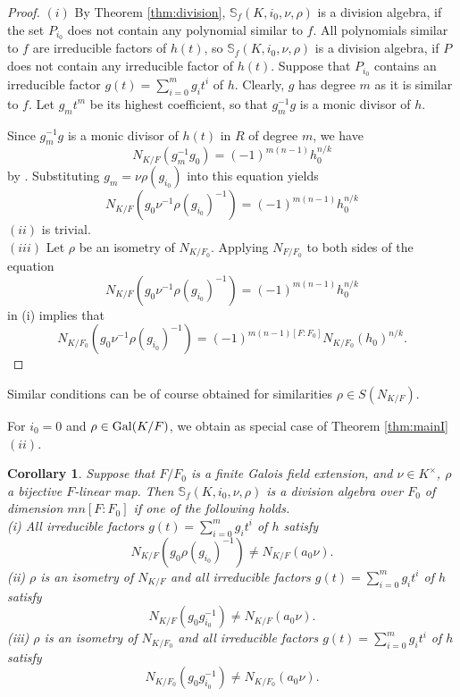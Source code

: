 \documentclass[12pt]{amsart}
\theoremstyle{plain}
\newtheorem{corollary}[theorem]{Corollary}
\theoremstyle{definition}
\numberwithin{equation}{section}
\numberwithin{figure}{section}
\begin{document}
\begin{proof}
$(i) $ By Theorem \ref{thm:division}, $\mathbb{S}_f(K,i_0,\nu,\rho)$
 is a division algebra, if the set $ P_{i_0} $  does not contain any polynomial similar to $f$. All polynomials similar to $f$ are
irreducible factors of $h(t)$, so $\mathbb{S}_f(K,i_0,\nu,\rho)$ is a division algebra, if $ P $ does not contain any irreducible factor of $h(t)$.
Suppose that $P_{i_0} $ contains an irreducible factor $g(t)=\sum_{i=0}^{m} g_it^i$ of $h$. Clearly,
 $g$ has degree $m$ as it is similar to $f$. Let  $g_{m} t^{m}$ be its highest coefficient, so that $g_{m}^{-1}g$ is a monic divisor of $h$.


Since  $g_{m}^{-1}g$ is a monic divisor of $h(t)$ in $R$ of degree $m$, we have
$$N_{K/F}(g_m^{-1}g_0 )=(-1)^{m(n-1)}h_0^{n/k}$$
 by \cite[Theorem 3.15]{NewS}.
Substituting $g_{m}=\nu\rho(g_{i_0})$
into this equation yields
$$N_{K/F}(g_0 \nu^{-1}\rho(g_{i_0})^{-1} )=(-1)^{m(n-1)}h_0^{n/k}$$
 $(ii)$ is trivial.
 \\ $(iii)$ Let $\rho $ be an isometry of $N_{K/F_0}$. Applying $N_{F/F_0}$ to both sides of the equation
 $$N_{K/F}(g_0 \nu^{-1}\rho(g_{i_0})^{-1} )=(-1)^{m(n-1)}h_0^{n/k}$$
  in (i) implies that
$$N_{K/F_0}(g_0 \nu^{-1}\rho(g_{i_0})^{-1} )=(-1)^{m(n-1)[F:F_0]}N_{K/F_0}(h_0)^{n/k}.$$
\end{proof}


  Similar conditions can be of course obtained for similarities $\rho\in S(N_{K/F})$.

  For $i_0=0$ and $\rho\in {\rm Gal}(K/F)$, we obtain \cite[Theorem 22]{PT} as special case of Theorem \ref{thm:mainI} $(ii)$.


\begin{corollary}\label{cor:mainI}
Suppose  that $F/F_0$ is a finite Galois field extension, and $\nu\in K^\times$, $\rho$ a bijective $F$-linear map.
 Then $\mathbb{S}_f(K,i_0,\nu,\rho)$  is a division algebra over $F_0$ of dimension $mn[F:F_0]$ if one of the following holds.
\\ (i) All irreducible factors $g(t)=\sum_{i=0}^{m} g_it^i$ of $h$   satisfy
 $$ N_{K/F}(g_0\rho(g_{i_0})^{-1} )\not= N_{K/F}(a_0  \nu).$$
 (ii)  $\rho$ is an isometry of $N_{K/F}$ and  all irreducible factors $g(t)=\sum_{i=0}^{m} g_it^i$  of $h$   satisfy
$$N_{K/F}(g_0 g_{i_0}^{-1})\not= N_{K/F}(a_0 \nu).$$
 (iii) $\rho$ is an isometry of $N_{K/F_0}$ and all irreducible factors $g(t)=\sum_{i=0}^{m} g_it^i$  of $h$  satisfy
$$N_{K/F_0}(g_0 g_{i_0}^{-1})\not= N_{K/F_0}(a_0 \nu).$$
\end{corollary}
\end{document}
